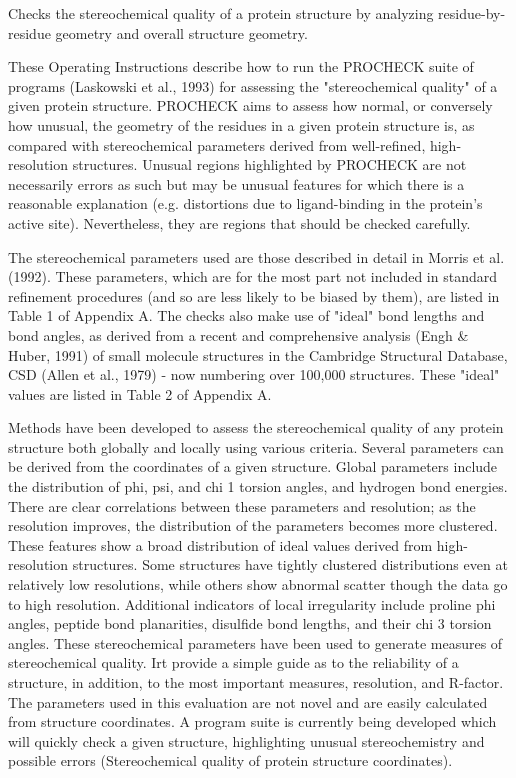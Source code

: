 \documentclass[11pt, letterpaper, portuguese]{article}
\begin{document}
    \par{Checks the stereochemical quality of a protein structure by analyzing residue-by-residue geometry and overall structure geometry.}

    \par{These Operating Instructions describe how to run the PROCHECK suite of programs (Laskowski et al., 1993) for assessing the "stereochemical quality" of a given protein structure. PROCHECK aims to assess how normal, or conversely how unusual, the geometry of the residues in a given protein structure is, as compared with stereochemical parameters derived from well-refined, high-resolution structures. Unusual regions highlighted by PROCHECK are not necessarily errors as such but may be unusual features for which there is a reasonable explanation (e.g. distortions due to ligand-binding in the protein's active site). Nevertheless, they are regions that should be checked carefully.}

    \par{The stereochemical parameters used are those described in detail in Morris et al. (1992). These parameters, which are for the most part not included in standard refinement procedures (and so are less likely to be biased by them), are listed in Table 1 of Appendix A. The checks also make use of "ideal" bond lengths and bond angles, as derived from a recent and comprehensive analysis (Engh \& Huber, 1991) of small molecule structures in the Cambridge Structural Database, CSD (Allen et al., 1979) - now numbering over 100,000 structures. These "ideal" values are listed in Table 2 of Appendix A.}

    \par{Methods have been developed to assess the stereochemical quality of any protein structure both globally and locally using various criteria. Several parameters can be derived from the coordinates of a given structure. Global parameters include the distribution of phi, psi, and chi 1 torsion angles, and hydrogen bond energies. There are clear correlations between these parameters and resolution; as the resolution improves, the distribution of the parameters becomes more clustered. These features show a broad distribution of ideal values derived from high-resolution structures. Some structures have tightly clustered distributions even at relatively low resolutions, while others show abnormal scatter though the data go to high resolution. Additional indicators of local irregularity include proline phi angles, peptide bond planarities, disulfide bond lengths, and their chi 3 torsion angles. These stereochemical parameters have been used to generate measures of stereochemical quality. Irt provide a simple guide as to the reliability of a structure, in addition, to the most important measures, resolution, and R-factor. The parameters used in this evaluation are not novel and are easily calculated from structure coordinates. A program suite is currently being developed which will quickly check a given structure, highlighting unusual stereochemistry and possible errors (Stereochemical quality of protein structure coordinates).}
\end{document}
